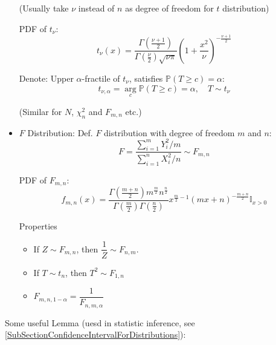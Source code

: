 \begin{itemize}
            (Usually take $\nu$ instead of $n$ as degree of freedom for $ t $ distribution)

            PDF of $t_\nu$:
            \begin{equation}        
                t_\nu(x)=\dfrac{\Gamma(\frac{\nu+1}{2})}{\Gamma(\frac{\nu}{2})\sqrt{\nu\pi}}\left(1+\frac{x^2}{\nu}\right)^{-\frac{\nu+1}{2}}
            \end{equation}

            Denote: Upper $\alpha$-fractile of $t_\nu$, satisfies $\mathbb{P}(T\geq c)=\alpha$:
            \begin{equation}        
                t_{\nu,\alpha}=\mathop{\arg}\limits_{c}\mathbb{P}(T\geq c)=\alpha,\quad T\sim t_\nu 
            \end{equation}
            
            (Similar for $ N $, $\chi^2_n$ and $F_{m,n}$ etc.)
            \item $F$ Distribution: Def. $F$ distribution with degree of freedom $m$ and $n$:
            \begin{equation}        
                F=\frac{\sum_{i=1}^mY_i^2\big/ m}{\sum_{i=1}^nX_i^2\big/ n}\sim F_{m,n}
            \end{equation}

            PDF of $F_{m,n}$:
            \begin{equation}        
                f_{m,n}(x)=\frac{\Gamma(\frac{m+n}{2})m^\frac{m}{2}n^{\frac{n}{2}}}{\Gamma(\frac{m}{2})\Gamma(\frac{n}{2})}x^{\frac{m}{2}-1}(mx+n)^{-\frac{m+n}{2}} \mathbb{I}_{x>0}
            \end{equation}

            Properties
            \begin{itemize}
                \item If $Z\sim F_{m,n}$, then $\dfrac{1}{Z}\sim F_{n,m}$.
                \item If $T\sim t_n$, then $T^2\sim F_{1,n}$
                \item $F_{m,n,1-\alpha}=\dfrac{1}{F_{n,m,\alpha}}$
            \end{itemize}
        \end{itemize}

        \begin{point}
            Some useful Lemma (uesd in statistic inference, see \autoref{SubSectionConfidenceIntervalForDistributions}):
        \end{point}
        
